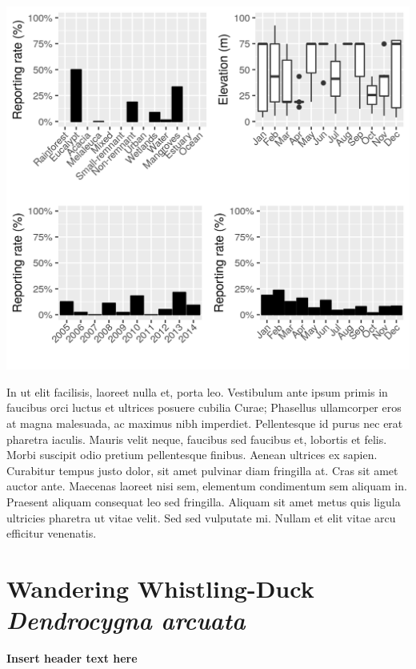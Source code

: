 \documentclass[12pt,openany,oneside]{book}
\theoremstyle{definition}
\theoremstyle{definition}
\theoremstyle{definition}
\theoremstyle{remark}
\begin{document}
\includegraphics{assets/graphs/Dendrocygna-eytoni.png}

In ut elit facilisis, laoreet nulla et, porta leo. Vestibulum ante ipsum
primis in faucibus orci luctus et ultrices posuere cubilia Curae;
Phasellus ullamcorper eros at magna malesuada, ac maximus nibh
imperdiet. Pellentesque id purus nec erat pharetra iaculis. Mauris velit
neque, faucibus sed faucibus et, lobortis et felis. Morbi suscipit odio
pretium pellentesque finibus. Aenean ultrices ex sapien. Curabitur
tempus justo dolor, sit amet pulvinar diam fringilla at. Cras sit amet
auctor ante. Maecenas laoreet nisi sem, elementum condimentum sem
aliquam in. Praesent aliquam consequat leo sed fringilla. Aliquam sit
amet metus quis ligula ultricies pharetra ut vitae velit. Sed sed
vulputate mi. Nullam et elit vitae arcu efficitur venenatis.

\clearpage

\hypertarget{wandering-whistling-duck-dendrocygna-arcuata}{%
\section{\texorpdfstring{Wandering Whistling-Duck \emph{Dendrocygna
arcuata}}{Wandering Whistling-Duck Dendrocygna arcuata}}\label{wandering-whistling-duck-dendrocygna-arcuata}}


\textbf{Insert header text here}
\end{document}
